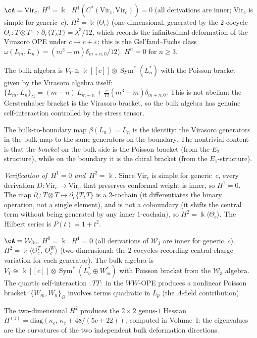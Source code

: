 \begin{computation}
\label{comp:bulk-virasoro}
$\cA=\mathrm{Vir}_c$. $H^0=\Bbbk$.
$H^1(C^*(\mathrm{Vir}_c,\mathrm{Vir}_c))=0$
(all derivations are inner; $\mathrm{Vir}_c$ is simple
for generic~$c$).
$H^2=\Bbbk\langle\Theta_c\rangle$ (one-dimensional,
generated by the $2$-cocycle
$\Theta_c\colon T\otimes T \mapsto \partial_c\{T_\lambda T\} = \lambda^3/12$,
which records the infinitesimal deformation of the Virasoro OPE
under $c \to c + \varepsilon$; this is the Gel'fand--Fuchs
class $\omega(L_m,L_n)=(m^3-m)\delta_{m+n,0}/12$).
$H^n=0$ for $n\ge 3$.

The bulk algebra is
$V_T\cong\Bbbk[[c]]\otimes\operatorname{Sym}^*\!(L_n^*)$
with the Poisson bracket given by the Virasoro algebra
itself:
$\{L_m,L_n\}_G=(m-n)\,L_{m+n}+\frac{c}{12}(m^3-m)\delta_{m+n,0}$.
This is not abelian: the Gerstenhaber bracket
is the Virasoro bracket, so the bulk algebra has genuine
self-interaction controlled by the stress tensor.

The bulk-to-boundary map $\beta(L_n)=L_n$ is the identity:
the Virasoro generators in the bulk map to the same
generators on the boundary. The nontrivial content is that
the \emph{bracket} on the bulk side is the Poisson bracket
(from the $E_2$-structure), while on the boundary it is the
chiral bracket (from the $E_1$-structure).

\emph{Verification of~$H^1=0$ and~$H^2=\Bbbk$.}
Since $\mathrm{Vir}_c$ is simple for generic~$c$, every derivation
$D\colon \mathrm{Vir}_c\to\mathrm{Vir}_c$ that preserves
conformal weight is inner, so $H^1=0$. The map
$\partial_c\colon T\otimes T \mapsto \partial_c\{T_\lambda T\}$
is a $2$-cochain (it differentiates the binary operation, not
a single element), and is not a coboundary
(it shifts the central term without being generated by
any inner $1$-cochain), so $H^2=\Bbbk\langle\Theta_c\rangle$.
The Hilbert series is $P(t)=1+t^2$.
\end{computation}

\begin{computation}
\label{comp:bulk-w3}
$\cA=\mathcal W_3{}_c$. $H^0=\Bbbk$.
$H^1=0$ (all derivations of $\mathcal W_3$ are inner
for generic~$c$).
$H^2=\Bbbk\langle\Theta_c^T,\,\Theta_c^W\rangle$
(two-dimensional: the $2$-cocycles recording
central-charge variation for each generator).
The bulk algebra is
$V_T\cong\Bbbk[[c]]\otimes
\operatorname{Sym}^*\!(L_n^*\oplus W_m^*)$
with Poisson bracket from the $\mathcal W_3$ algebra.
The quartic self-interaction ${:}TT{:}$ in the $WW$-OPE
produces a nonlinear Poisson bracket:
$\{W_m,W_n\}_G$ involves terms quadratic in $L_p$
(the $\Lambda$-field contribution).

The two-dimensional $H^2$ produces the $2\times 2$
genus-$1$ Hessian
$H^{(1)}=\mathrm{diag}(\kappa_c,\,\kappa_c+48/(5c+22))$,
computed in Volume~I:
the eigenvalues are the curvatures of the two independent
bulk deformation directions.
\end{computation}

